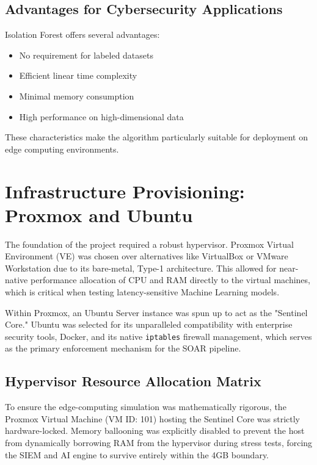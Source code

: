 \documentclass[12pt, a4paper]{report}
\begin{document}
	\subsection{Advantages for Cybersecurity Applications}
	
	Isolation Forest offers several advantages:
	
	\begin{itemize}
		\item No requirement for labeled datasets
		\item Efficient linear time complexity
		\item Minimal memory consumption
		\item High performance on high-dimensional data
	\end{itemize}
	
	These characteristics make the algorithm particularly suitable for
	deployment on edge computing environments.
	
	\section{Infrastructure Provisioning: Proxmox and Ubuntu}
	The foundation of the project required a robust hypervisor. Proxmox Virtual Environment (VE) was chosen over alternatives like VirtualBox or VMware Workstation due to its bare-metal, Type-1 architecture. This allowed for near-native performance allocation of CPU and RAM directly to the virtual machines, which is critical when testing latency-sensitive Machine Learning models. 
	
	Within Proxmox, an Ubuntu Server instance was spun up to act as the "Sentinel Core." Ubuntu was selected for its unparalleled compatibility with enterprise security tools, Docker, and its native \texttt{iptables} firewall management, which serves as the primary enforcement mechanism for the SOAR pipeline.
	
	\subsection{Hypervisor Resource Allocation Matrix}
	To ensure the edge-computing simulation was mathematically rigorous, the Proxmox Virtual Machine (VM ID: 101) hosting the Sentinel Core was strictly hardware-locked. Memory ballooning was explicitly disabled to prevent the host from dynamically borrowing RAM from the hypervisor during stress tests, forcing the SIEM and AI engine to survive entirely within the 4GB boundary.
	
\end{document}
